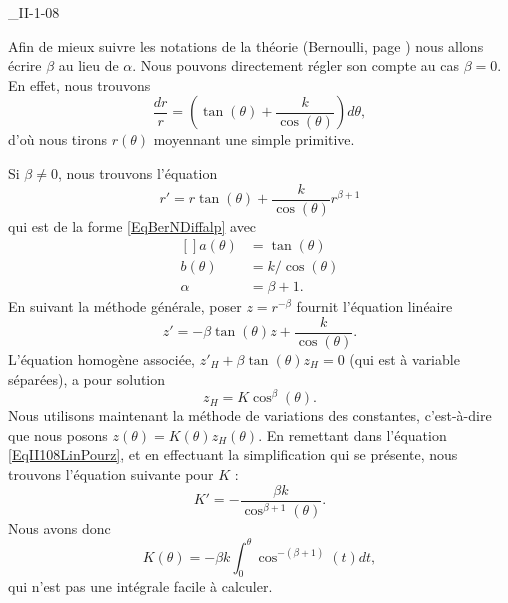 

\begin{corrige}{_II-1-08}

Afin de mieux suivre les notations de la théorie (Bernoulli, page \pageref{SubSecBernh}) nous allons écrire $\beta$ au lieu de $\alpha$. Nous pouvons directement régler son compte au cas $\beta=0$. En effet, nous trouvons
\begin{equation}
	\frac{ dr }{ r }=\left( \tan(\theta)+\frac{ k }{ \cos(\theta) } \right)d\theta,
\end{equation}
d'où nous tirons $r(\theta)$ moyennant une simple primitive.

Si $\beta\neq 0$, nous trouvons l'équation
\begin{equation}
	r'=r\tan(\theta)+\frac{ k }{ \cos(\theta) }r^{\beta+1}
\end{equation}
qui est de la forme \eqref{EqBerNDiffalp} avec
\begin{equation}
	\begin{aligned}[]
		a(\theta)	&=\tan(\theta)\\
		b(\theta)	&=k/\cos(\theta)\\
		\alpha		&=\beta+1.
	\end{aligned}
\end{equation}
En suivant la méthode générale, poser $z=r^{-\beta}$ fournit l'équation linéaire
\begin{equation}		\label{EqII108LinPourz}
	z'=-\beta\tan(\theta) z+\frac{ k }{ \cos(\theta) }.
\end{equation}
L'équation homogène associée, $z'_H+\beta\tan(\theta)z_H=0$ (qui est à variable séparées), a pour solution
\begin{equation}
	z_H=K\cos^{\beta}(\theta).
\end{equation}
Nous utilisons maintenant la méthode de variations des constantes, c'est-à-dire que nous posons $z(\theta)=K(\theta)z_H(\theta)$. En remettant dans l'équation \ref{EqII108LinPourz}, et en effectuant la simplification qui se présente, nous trouvons l'équation suivante pour $K$ :
\begin{equation}
	K'=-\frac{ \beta k }{ \cos^{\beta+1}(\theta) }.
\end{equation}
Nous avons donc
\begin{equation}
	K(\theta)=-\beta k\int_0^{\theta}\cos^{-(\beta+1)}(t)dt,
\end{equation}
qui n'est pas une intégrale facile à calculer.


\end{corrige}
